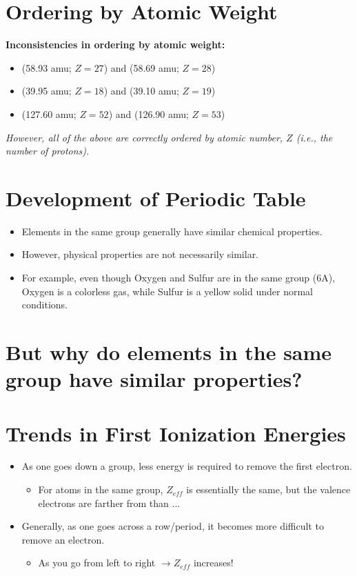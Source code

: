 \documentclass[
	chapter=8,
	title={Periodic Properties of the Elements},
	showanswers=true,
]{chem122notes}
\begin{document}
\section{Ordering by Atomic Weight}\label{sec:ordering-by-atomic-weight}
\textbf{Inconsistencies in ordering by atomic weight:}
\begin{itemize}\newcommand{\weights}[3]{\ce{#1} (#2 amu; $Z=#3$)}
	\item \weights{Co}{58.93}{27} and \weights{Ni}{58.69}{28}
	\item \weights{Ar}{39.95}{18} and \weights{K}{39.10}{19}
	\item \weights{Te}{127.60}{52} and \weights{I}{126.90}{53}
\end{itemize}
\emph{However, all of the above are correctly ordered by atomic number, $Z$ (i.e., the number of protons).}

\section{Development of Periodic Table}\label{sec:development-of-periodic-table}
\begin{itemize}
	\item Elements in the same group generally have similar chemical properties.
	\item However, physical properties are not necessarily similar.
	\item For example, even though Oxygen and Sulfur are in the same group (6A), Oxygen is a colorless gas, while Sulfur is a yellow solid under normal conditions.
\end{itemize}

\section{But why do elements in the same group have similar properties?}\label{sec:but-why-do-elements-in-the-same-group-have-similar-properties?}




\section{Trends in First Ionization Energies}\label{sec:trends-in-first-ionization-energies}
\begin{itemize}
	\item As one goes down a group, less energy is required to remove the first electron.
	\begin{itemize}
		\item For atoms in the same group, $Z_{eff}$ is essentially the same, but the valence electrons are farther from than $\dots$
	\end{itemize}
	\item Generally, as one goes across a row/period, it becomes more difficult to remove an electron.
	\begin{itemize}
		\item As you go from left to right $\rightarrow Z_{eff}$ increases!
	\end{itemize}
\end{itemize}
\end{document}
